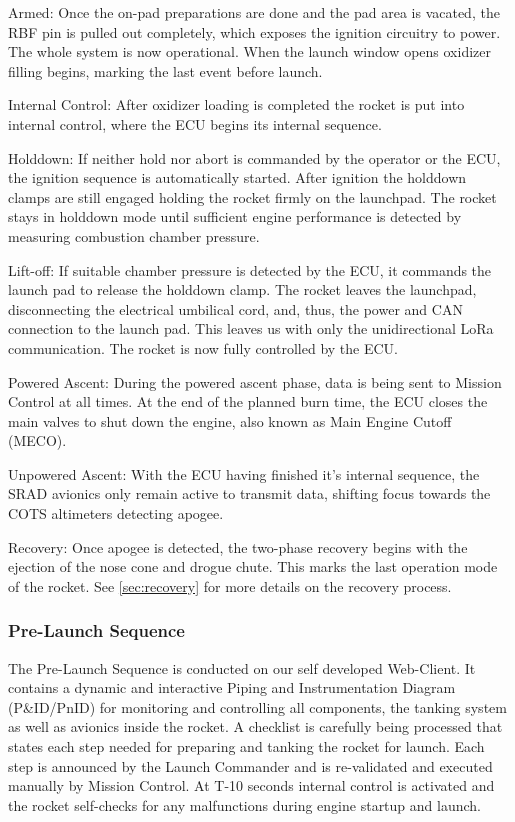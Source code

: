 Armed:
Once the on-pad preparations are done and the pad area is vacated, the RBF pin is pulled out completely, which exposes the ignition circuitry to power. The whole system is now operational. When the launch window opens oxidizer filling begins, marking the last event before launch.

Internal Control:
After oxidizer loading is completed the rocket is put into internal control, where the ECU begins its internal sequence.

Holddown:
If neither hold nor abort is commanded by the operator or the ECU, the ignition sequence is automatically started. After ignition the holddown clamps are still engaged holding the rocket firmly on the launchpad. The rocket stays in holddown mode until sufficient engine performance is detected by measuring combustion chamber pressure.

Lift-off:
If suitable chamber pressure is detected by the ECU, it commands the launch pad to release the holddown clamp. The rocket leaves the launchpad, disconnecting the electrical umbilical cord, and, thus, the power and CAN connection to the launch pad. This leaves us with only the unidirectional LoRa communication. The rocket is now fully controlled by the ECU. 

Powered Ascent:
During the powered ascent phase, data is being sent to Mission Control at all times. At the end of the planned burn time, the ECU closes the main valves to shut down the engine, also known as Main Engine Cutoff (MECO).

Unpowered Ascent:
With the ECU having finished it's internal sequence, the SRAD avionics only remain active to transmit data, shifting focus towards the COTS altimeters detecting apogee.

Recovery:
Once apogee is detected, the two-phase recovery begins with the ejection of the nose cone and drogue chute. This marks the last operation mode of the rocket. See \cref{sec:recovery} for more details on the recovery process.

\subsubsection{Pre-Launch Sequence}

The Pre-Launch Sequence is conducted on our self developed Web-Client.
It contains a dynamic and interactive Piping and Instrumentation Diagram (P\&ID/PnID) for monitoring and controlling all components, the tanking system as well as avionics inside the rocket. A checklist is carefully being processed that states each step needed for preparing and tanking the rocket for launch. Each step is announced by the Launch Commander and is re-validated and executed manually by Mission Control. At T-10 seconds internal control is activated and the rocket self-checks for any malfunctions during engine startup and launch.

